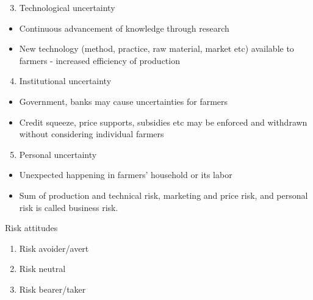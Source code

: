 \documentclass[12pt,ignorenonframetext,aspectratio=169]{beamer}
\providecommand{\tightlist}{%
  \setlength{\itemsep}{0pt}\setlength{\parskip}{0pt}}
\begin{document}
\begin{frame}{}
\protect\hypertarget{section-4}{}
\footnotesize

\begin{enumerate}
\setcounter{enumi}{2}
\tightlist
\item
  Technological uncertainty
\end{enumerate}

\begin{itemize}
\tightlist
\item
  Continuous advancement of knowledge through research
\item
  New technology (method, practice, raw material, market etc) available
  to farmers - increased efficiency of production
\end{itemize}

\begin{enumerate}
\setcounter{enumi}{3}
\tightlist
\item
  Institutional uncertainty
\end{enumerate}

\begin{itemize}
\tightlist
\item
  Government, banks may cause uncertainties for farmers
\item
  Credit squeeze, price supports, subsidies etc may be enforced and
  withdrawn without considering individual farmers
\end{itemize}

\begin{enumerate}
\setcounter{enumi}{4}
\tightlist
\item
  Personal uncertainty
\end{enumerate}

\begin{itemize}
\tightlist
\item
  Unexpected happening in farmers' household or its labor
\item
  Sum of production and technical risk, marketing and price risk, and
  personal risk is called business risk.
\end{itemize}
\end{frame}

\begin{frame}{Risk attitudes}
\protect\hypertarget{risk-attitudes}{}
\begin{enumerate}
\tightlist
\item
  Risk avoider/avert
\item
  Risk neutral
\item
  Risk bearer/taker
\end{enumerate}
\end{frame}
\end{document}
